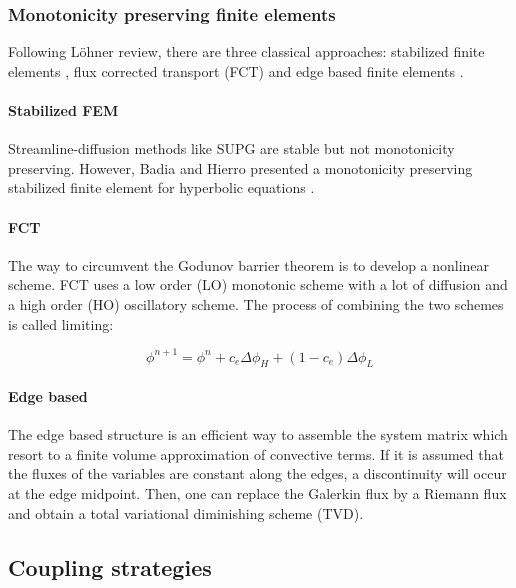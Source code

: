 \subsubsection{Monotonicity preserving finite elements}

Following Löhner review, there are three classical approaches: stabilized finite elements \cite{lohner2008}, flux corrected transport (FCT) \cite{lohner2008ch9} and edge based finite elements \cite{lohner2008ch10}.

\paragraph*{Stabilized FEM} Streamline-diffusion methods like SUPG are stable but not
monotonicity preserving. However, Badia and Hierro presented a monotonicity preserving stabilized finite element for hyperbolic equations \cite{badia2014}.

\paragraph*{FCT} The way to circumvent the Godunov barrier theorem \cite{godunov1959} is to develop a nonlinear scheme. FCT uses a low order (LO) monotonic scheme with a lot of diffusion and a high order (HO) oscillatory scheme. The process of combining the two schemes is called limiting:

\begin{equation}
\phi^{n+1} = \phi^n + c_e\Delta \phi_H + (1-c_e)\Delta \phi_L
\end{equation}

\paragraph*{Edge based} The edge based structure is an efficient way to assemble the system matrix which resort to a
finite volume approximation of convective terms. If it is assumed that the fluxes of the variables are constant along the edges, a discontinuity will occur at the edge midpoint. Then, one can replace the Galerkin flux by a Riemann flux and obtain a total variational diminishing scheme (TVD).





\subsection{Coupling strategies}


